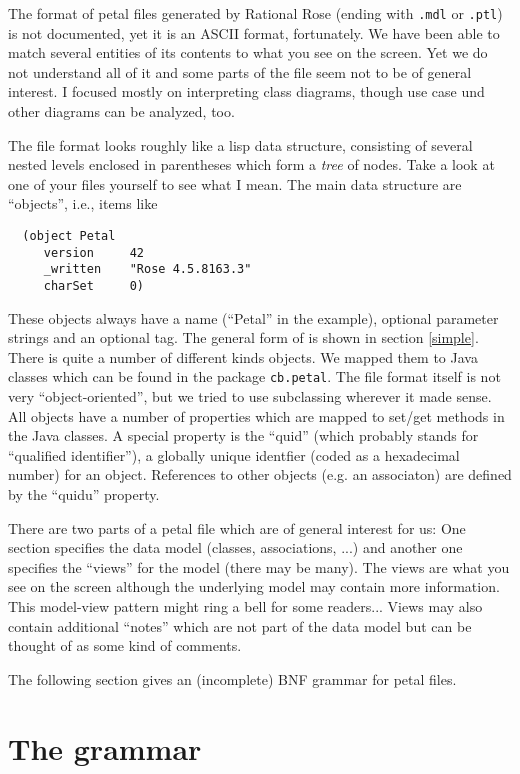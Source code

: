 \documentclass{article}
\begin{document}
The format of petal files generated by Rational Rose (ending with
\texttt{.mdl} or \texttt{.ptl}) is not documented, yet it is an ASCII
format, fortunately. We have been able to match several entities of its
contents to what you see on the screen. Yet we do not understand all of
it and some parts of the file seem not to be of general interest. I
focused mostly on interpreting class diagrams, though use case
und other diagrams can be analyzed, too.

The file format looks roughly like a lisp data structure, consisting
of several nested levels enclosed in parentheses which form a \emph{tree}
of nodes.  Take a look at one of your files yourself to see what I
mean. The main data structure are ``objects'', i.e., items like

\begin{verbatim}
  (object Petal
     version     42
     _written    "Rose 4.5.8163.3"
     charSet     0)
\end{verbatim}

These objects always have a name (``Petal'' in the example), optional
parameter strings and an optional tag. The general form of is shown in
section \ref{simple}.  There is quite a number of different kinds
objects. We mapped them to Java classes which can be found in the
package \texttt{cb.petal}. The file format itself is not very
``object-oriented'', but we tried to use subclassing wherever it made
sense. All objects have a number of properties which are mapped to
set/get methods in the Java classes. A special property is the
``quid'' (which probably stands for ``qualified identifier''), a
globally unique identfier (coded as a hexadecimal number) for an
object. References to other objects (e.g. an associaton) are defined
by the ``quidu'' property.

There are two parts of  a petal file which are of general interest for
us: One section specifies the data model (classes, associations, ...)
and another one specifies the ``views'' for the model (there may be
many). The views are what you see on the screen although the
underlying model may contain more information. This model-view pattern
might ring a bell for some readers... Views may also contain
additional ``notes'' which are not part of the data model but can be
thought of as some kind of comments.

The following section gives an (incomplete) BNF grammar for petal files.

\section{The grammar}
\end{document}
